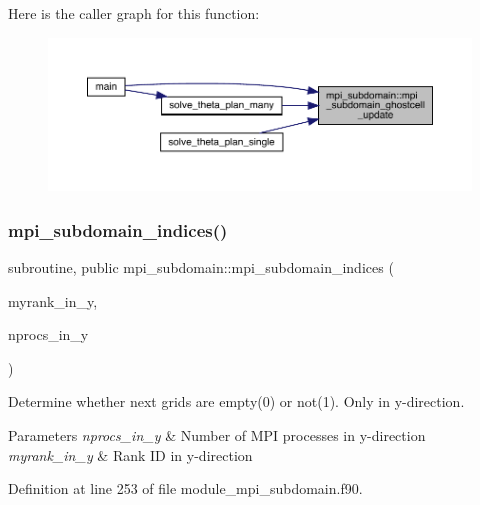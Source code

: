 Here is the caller graph for this function\+:
\nopagebreak
\begin{figure}[H]
\begin{center}
\leavevmode
\includegraphics[width=350pt]{namespacempi__subdomain_a2e34a77537009dd448375e8fdc8d5b62_icgraph}
\end{center}
\end{figure}
\mbox{\label{namespacempi__subdomain_afe948dc18da021f2448cf9a6265155fe}} 
\subsubsection{\texorpdfstring{mpi\_subdomain\_indices()}{mpi\_subdomain\_indices()}}
{\footnotesize\ttfamily subroutine, public mpi\+\_\+subdomain\+::mpi\+\_\+subdomain\+\_\+indices (\begin{DoxyParamCaption}\item[{integer, intent(in)}]{myrank\+\_\+in\+\_\+y,  }\item[{integer, intent(in)}]{nprocs\+\_\+in\+\_\+y }\end{DoxyParamCaption})}



Determine whether next grids are empty(0) or not(1). Only in y-\/direction. 


\begin{DoxyParams}{Parameters}
{\em nprocs\+\_\+in\+\_\+y} & Number of M\+PI processes in y-\/direction \\
\hline
{\em myrank\+\_\+in\+\_\+y} & Rank ID in y-\/direction \\
\hline
\end{DoxyParams}


Definition at line 253 of file module\+\_\+mpi\+\_\+subdomain.\+f90.

